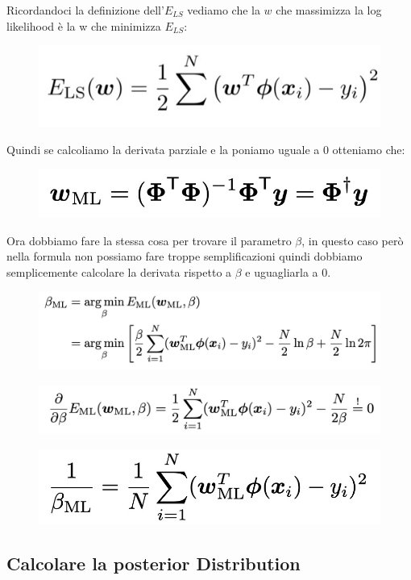\documentclass[14pt]{extreport}
\begin{document}
Ricordandoci la definizione dell'$E_{LS}$ vediamo che la $w$ che massimizza la log likelihood è la w che minimizza $E_{LS}$:

\begin{figure}[H]
\centering
\includegraphics[width=0.4\linewidth]{110.jpeg}
\end{figure}

Quindi se calcoliamo la derivata parziale e la poniamo uguale a 0 otteniamo che:
\begin{figure}[H]
\centering
\includegraphics[width=0.5\linewidth]{112.jpeg}
\end{figure}

Ora dobbiamo fare la stessa cosa per trovare il parametro $\beta$, in questo caso però nella formula non possiamo fare troppe semplificazioni quindi
dobbiamo semplicemente calcolare la derivata rispetto a $\beta$ e uguagliarla a 0.

\begin{figure}[H]
\centering
\includegraphics[width=0.6\linewidth]{113.jpeg}
\end{figure}
\begin{figure}[H]
\centering
\includegraphics[width=0.6\linewidth]{114.jpeg}
\end{figure}
\begin{figure}[H]
\centering
\includegraphics[width=0.4\linewidth]{115.jpeg}
\end{figure}

\subsection{Calcolare la posterior Distribution}
\end{document}
